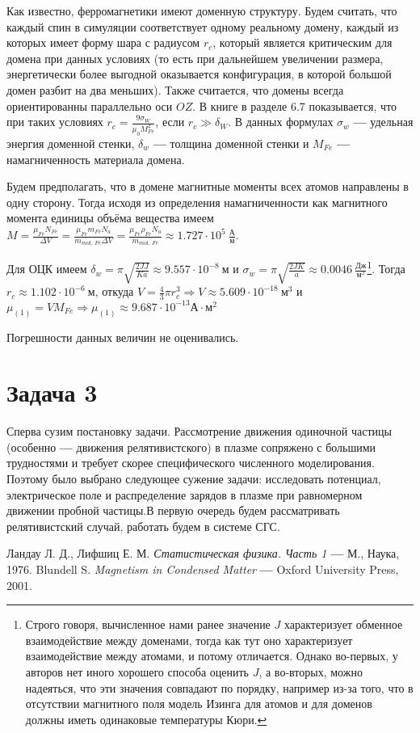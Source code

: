 \documentclass[oneside,final,14pt]{extarticle}
\begin{document}
	Как известно, ферромагнетики имеют доменную структуру. Будем считать, что каждый спин в симуляции соответствует одному реальному домену, каждый из которых имеет форму шара с радиусом $r_{c}$, который является критическим для домена при данных условиях (то есть при дальнейшем увеличении размера, энергетически более выгодной оказывается конфигурация, в которой большой домен разбит на два меньших). Также считается, что домены всегда ориентированны параллельно оси $OZ$. В книге \cite{magn} в разделе 6.7 показывается, что при таких условиях $r_{c}=\frac{9\sigma_{W}}{\mu_{0}M_{Fe}^2}$, если $r_{c}\gg \delta_{W}$. В данных формулах $\sigma_{w}$ \textbf{---} удельная энергия доменной стенки, $\delta_{w}$ \textbf{---} толщина доменной стенки и $M_{Fe}$ \textbf{---} намагниченность материала домена. 

	Будем предполагать, что в домене магнитные моменты всех атомов направлены в одну сторону. Тогда исходя из определения намагниченности как магнитного момента единицы объёма вещества имеем $M=\frac{\mu_{Fe}N_{Fe}}{\Delta V}=\frac{\mu_{Fe}m_{Fe}N_{a}}{m_{mol, \ Fe}\Delta V}=\frac{\mu_{Fe}\rho_{Fe}N_{a}}{m_{mol, \ Fe}}\approx 1.727 \cdot 10^{5} \ \frac{\text{А}}{\text{м}}$.

	Для ОЦК имеем $\delta_{w}=\pi \sqrt{\frac{2JJ}{Ka}}\approx 9.557\cdot 10^{-8} \ \text{м}$ и $\sigma_{w}=\pi \sqrt{\frac{2JK}{a}}\approx 0.0046 \ \frac{\text{Дж}}{\text{м}^2}$\footnote{Строго говоря, вычисленное нами ранее значение $J$ характеризует обменное взаимодействие между доменами, тогда как тут оно характеризует взаимодействие между атомами, и потому отличается. Однако во-первых, у авторов нет иного хорошего способа оценить $J$, а во-вторых, можно надеяться, что эти значения совпадают по порядку, например из-за того, что в отсутствии магнитного поля модель Изинга для атомов и для доменов должны иметь одинаковые температуры Кюри.}. Тогда $r_{c} \approx 1.102 \cdot 10^{-6} \ \text{м}$, откуда $V=\frac{4}{3}\pi r_{c}^3 \Rightarrow \boxed{V \approx 5.609 \cdot 10^{-18} \ \text{м}^3}$ и $\mu_{(1)}=VM_{Fe} \Rightarrow \boxed{\mu_{(1)}\approx 9.687 \cdot 10^{-13} \text{А}\cdot\text{м}^2}$

	Погрешности данных величин не оценивались.
	\newpage
	
	\section{Задача 3}
	
	Сперва сузим постановку задачи. Рассмотрение движения одиночной частицы (особенно \textbf{---} движения релятивистского) в плазме сопряжено с большими трудностями и требует скорее специфического численного моделирования. Поэтому было выбрано следующее сужение задачи: исследовать потенциал, электрическое поле и распределение зарядов в плазме при равномерном движении пробной частицы.В первую очередь будем рассматривать релятивистский случай, работать будем в системе СГС.  

	\newpage
	\begin{thebibliography}{0}
		 Ландау Л. Д., Лифшиц Е. М. \textit{Статистическая физика. Часть 1} \textbf{---} М., Наука, 1976.
		 Blundell S. \textit{Magnetism in Condensed Matter} \textbf{---} Oxford University Press, 2001.
	\end{thebibliography}
\end{document}
